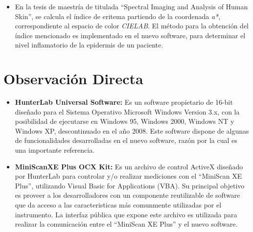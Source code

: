 \begin{itemize}
			\item En la tesis de maestr\'{i}a de \cite{Bersha} titulada ``Spectral Imaging and Analysis of Human Skin'', se calcula el \'{i}ndice de eritema partiendo de la coordenada \textit{a*}, correspondiente al espacio de color \textit{CIELAB}. El m\'{e}todo para la obtenci\'{o}n del \'{i}ndice mencionado es implementado en el nuevo software, para determinar el nivel inflamatorio de la epidermis de un paciente.
		\end{itemize}

	\section{Observaci\'{o}n Directa}
		\begin{itemize}
			\item \textbf{HunterLab Universal Software:} Es un software propietario de 16-bit dise\~{n}ado para el Sistema Operativo Microsoft Windows Version 3.x, con la posibilidad de ejecutarse en Windows 95, Windows 2000, Windows NT y Windows XP, descontinuado en el a\~{n}o 2008. Este software dispone de algunas de funcionalidades desarrolladas en el nuevo software, raz\'{o}n por la cual es una importante referencia.
		
			\item \textbf{MiniScanXE Plus OCX Kit:} Es un archivo de control ActiveX dise\~{n}ado por HunterLab para controlar y/o realizar mediciones con el ``MiniScan XE Plus'', utilizando Visual Basic for Applications (VBA). Su principal objetivo es proveer a los desarrolladores con un componente reutilizable de software que da acceso a las caracteristicas m\'{a}s comunmente utilizadas por el instrumento. La interfaz p\'{u}blica que expone este archivo es utilizada para realizar la comunicaci\'{o}n entre el ``MiniScan XE Plus'' y el nuevo software.
		\end{itemize}